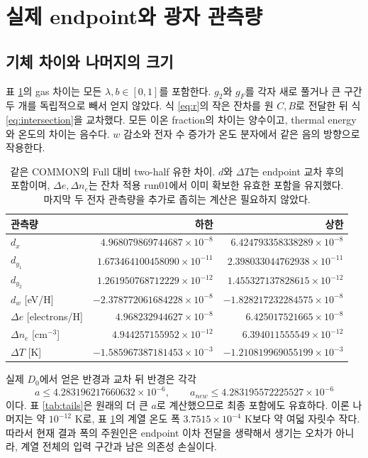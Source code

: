 \section{실제 endpoint와 광자 관측량}\label{sec:results}
\subsection{기체 차이와 나머지의 크기}
표 \ref{tab:gasresults}의 gas 차이는 모든 $\lambda,b\in[0,1]$를 포함한다. $g_2$와 $g_F$를 각자 새로 풀거나 큰 구간 두 개를 독립적으로 빼서 얻지 않았다. 식 \eqref{eq:r}의 작은 잔차를 원 $C,B$로 전달한 뒤 식 \eqref{eq:intersection}을 교차했다. 모든 이온 fraction의 차이는 양수이고, thermal energy와 온도의 차이는 음수다. $w$ 감소와 전자 수 증가가 온도 분자에서 같은 음의 방향으로 작용한다.\cite{app16,endpoint16}

\begin{table}[H]
\centering\small
\begin{tabular}{@{}lrr@{}}
\toprule
관측량 & 하한 & 상한\\\midrule
$d_x$ & $4.968079869744687\times10^{-8}$ & $6.424793358338289\times10^{-8}$\\
$d_{y_1}$ & $1.673464100458090\times10^{-11}$ & $2.398033044762938\times10^{-11}$\\
$d_{y_2}$ & $1.261950768712229\times10^{-12}$ & $1.455327137828615\times10^{-12}$\\
$d_w$ [eV/H] & $-2.378772061684228\times10^{-8}$ & $-1.828217232284575\times10^{-8}$\\
$\Delta e$ [electrons/H] & $4.968232944627\times10^{-8}$ & $6.425017521665\times10^{-8}$\\
$\Delta n_e$ [cm$^{-3}$] & $4.944257155952\times10^{-12}$ & $6.394011555549\times10^{-12}$\\
$\Delta T$ [K] & $-1.585967387181453\times10^{-3}$ & $-1.210819969055199\times10^{-3}$\\
\bottomrule
\end{tabular}
\caption{같은 COMMON의 Full 대비 two-half 유한 차이. $d$와 $\Delta T$는 endpoint 교차 후의 포함이며, $\Delta e,\Delta n_e$는 잔차 적용 run01에서 이미 확보한 유효한 포함을 유지했다. 마지막 두 전자 관측량을 추가로 좁히는 계산은 필요하지 않았다.}
\label{tab:gasresults}
\end{table}

실제 $D_0$에서 얻은 반경과 교차 뒤 반경은 각각
\[
a\le4.283196217660632\times10^{-6},\qquad
a_{new}\le4.283195572225527\times10^{-6}
\]
이다. 표 \ref{tab:tails}은 원래의 더 큰 $a$로 계산했으므로 최종 포함에도 유효하다. 이론 나머지는 약 $10^{-12}$ K로, 표 \ref{tab:gasresults}의 계열 온도 폭 $3.7515\times10^{-4}$ K보다 약 여덟 자릿수 작다. 따라서 현재 결과 폭의 주원인은 endpoint 이차 전달을 생략해서 생기는 오차가 아니라, 계열 전체의 입력 구간과 남은 의존성 손실이다.


